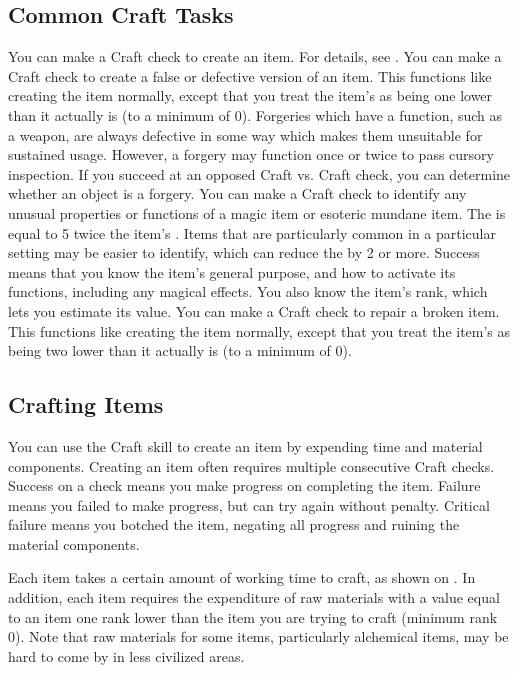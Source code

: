     \subsection{Common Craft Tasks}
         You can make a Craft check to create an item.
        For details, see .
         You can make a Craft check to create a false or defective version of an item.
        This functions like creating the item normally, except that you treat the item's  as being one lower than it actually is (to a minimum of 0).
        Forgeries which have a function, such as a weapon, are always defective in some way which makes them unsuitable for sustained usage.
        However, a forgery may function once or twice to pass cursory inspection.
         If you succeed at an opposed Craft vs. Craft check, you can determine whether an object is a forgery.
         You can make a Craft check to identify any unusual properties or functions of a magic item or esoteric mundane item.
        The  is equal to 5 \add twice the item's .
        Items that are particularly common in a particular setting may be easier to identify, which can reduce the  by 2 or more.
        Success means that you know the item's general purpose, and how to activate its functions, including any magical effects.
        You also know the item's rank, which lets you estimate its value.
         You can make a Craft check to repair a broken item. This functions like creating the item normally, except that you treat the item's  as being two lower than it actually is (to a minimum of 0).

    \subsection{Crafting Items}
        You can use the Craft skill to create an item by expending time and material components. Creating an item often requires multiple consecutive Craft checks. Success on a check means you make progress on completing the item. Failure means you failed to make progress, but can try again without penalty. Critical failure means you botched the item, negating all progress and ruining the material components.

        Each item takes a certain amount of working time to craft, as shown on .
        In addition, each item requires the expenditure of raw materials with a value equal to an item one rank lower than the item you are trying to craft (minimum rank 0).
        Note that raw materials for some items, particularly alchemical items, may be hard to come by in less civilized areas.


